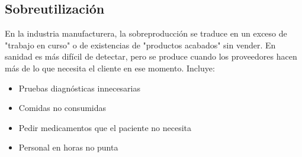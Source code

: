 \subsection{Sobreutilización}

En la industria manufacturera, la sobreproducción se traduce en un exceso de "trabajo en curso" o de existencias de "productos acabados" sin vender. En sanidad es más difícil de detectar, pero se produce cuando los proveedores hacen más de lo que necesita el cliente en ese momento. Incluye:

\begin{itemize}
    \item Pruebas diagnósticas innecesarias
    \item Comidas no consumidas
    \item Pedir medicamentos que el paciente no necesita
    \item Personal en horas no punta
\end{itemize}